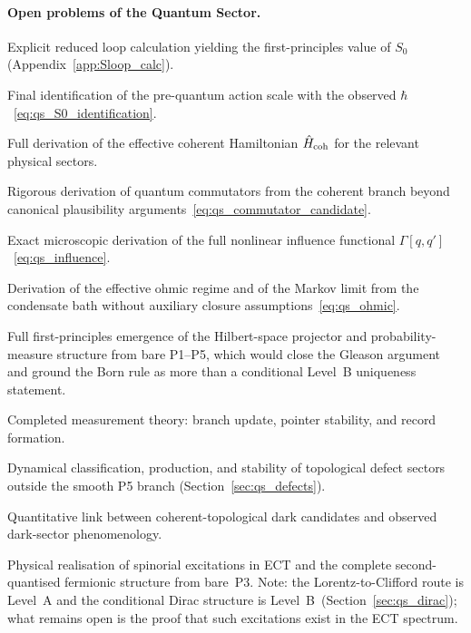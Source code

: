 \paragraph{Open problems of the Quantum Sector.}
\begin{description}[leftmargin=2.2em]
  \item[OP-Q1] Explicit reduced loop calculation yielding the
    first-principles value of $S_0$
    (Appendix~\ref{app:Sloop_calc}).
  \item[OP-Q2] Final identification of the pre-quantum action scale
    with the observed $\hbar$~\eqref{eq:qs_S0_identification}.
  \item[OP-Q3] Full derivation of the effective coherent Hamiltonian
    $\hat H_{\rm coh}$ for the relevant physical sectors.
  \item[OP-Q4] Rigorous derivation of quantum commutators from the
    coherent branch beyond canonical plausibility
    arguments~\eqref{eq:qs_commutator_candidate}.
  \item[OP-Q5] Exact microscopic derivation of the full nonlinear
    influence functional $\Gamma[q,q']$~\eqref{eq:qs_influence}.
  \item[OP-Q6] Derivation of the effective ohmic regime and of the
    Markov limit from the condensate bath without auxiliary closure
    assumptions~\eqref{eq:qs_ohmic}.
  \item[OP-Q7] Full first-principles emergence of the Hilbert-space
    projector and probability-measure structure from bare P1--P5,
    which would close the Gleason argument and ground the Born rule
    as more than a conditional Level~B uniqueness statement.
  \item[OP-Q8] Completed measurement theory: branch update, pointer
    stability, and record formation.
  \item[OP-Q9] Dynamical classification, production, and stability of
    topological defect sectors outside the smooth P5 branch
    (Section~\ref{sec:qs_defects}).
  \item[OP-Q10] Quantitative link between coherent-topological dark
    candidates and observed dark-sector phenomenology.
  \item[OP-Q11] Physical realisation of spinorial excitations in ECT
    and the complete second-quantised fermionic structure from bare~P3.
    Note: the Lorentz-to-Clifford route is Level~A and the conditional
    Dirac structure is Level~B~(Section~\ref{sec:qs_dirac});
    what remains open is the proof that such excitations exist in
    the ECT spectrum.

\end{description}
